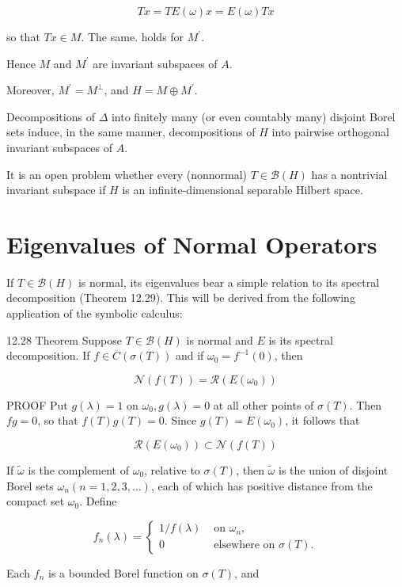\documentclass[10pt]{article}
\begin{document}
$$
T x=T E(\omega) x=E(\omega) T x
$$

so that $T x \in M$. The same. holds for $M^{\prime}$.

Hence $M$ and $M^{\prime}$ are invariant subspaces of $A$.

Moreover, $M^{\prime}=M^{\perp}$, and $H=M \oplus M^{\prime}$.

Decompositions of $\Delta$ into finitely many (or even countably many) disjoint Borel sets induce, in the same manner, decompositions of $H$ into pairwise orthogonal invariant subspaces of $A$.

It is an open problem whether every (nonnormal) $T \in \mathscr{B}(H)$ has a nontrivial invariant subspace if $H$ is an infinite-dimensional separable Hilbert space.

\section{Eigenvalues of Normal Operators}
If $T \in \mathscr{B}(H)$ is normal, its eigenvalues bear a simple relation to its spectral decomposition (Theorem 12.29). This will be derived from the following application of the symbolic calculus:

12.28 Theorem Suppose $T \in \mathscr{B}(H)$ is normal and $E$ is its spectral decomposition. If $f \in C(\sigma(T))$ and if $\omega_{0}=f^{-1}(0)$, then

$$
\mathscr{N}(f(T))=\mathscr{R}\left(E\left(\omega_{0}\right)\right)
$$

PROOF Put $g(\lambda)=1$ on $\omega_{0}, g(\lambda)=0$ at all other points of $\sigma(T)$. Then $f g=0$, so that $f(T) g(T)=0$. Since $g(T)=E\left(\omega_{0}\right)$, it follows that

$$
\mathscr{R}\left(E\left(\omega_{0}\right)\right) \subset \mathscr{N}(f(T))
$$

If $\tilde{\omega}$ is the complement of $\omega_{0}$, relative to $\sigma(T)$, then $\tilde{\omega}$ is the union of disjoint Borel sets $\omega_{n}(n=1,2,3, \ldots)$, each of which has positive distance from the compact set $\omega_{0}$. Define

$$
f_{n}(\lambda)= \begin{cases}1 / f(\lambda) & \text { on } \omega_{n}, \\ 0 & \text { elsewhere on } \sigma(T) .\end{cases}
$$

Each $f_{n}$ is a bounded Borel function on $\sigma(T)$, and
\end{document}
